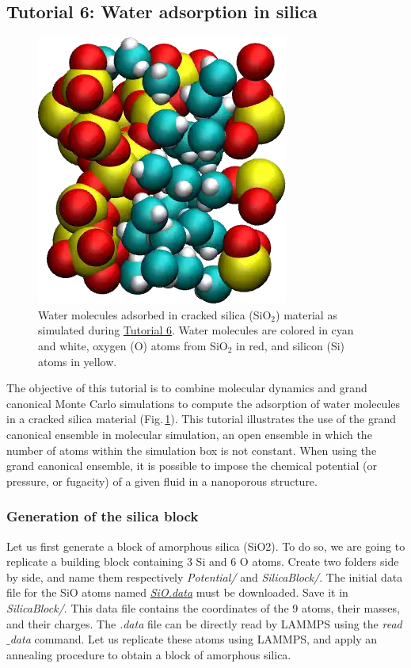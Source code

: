 \documentclass[9pt,tutorial]{livecoms}
\begin{document}
\subsection{Tutorial 6: Water adsorption in silica}
\label{gcmc-silica-label}

\begin{figure}
\centering
\includegraphics[width=0.55\linewidth]{GCMC}
\caption{Water molecules adsorbed in cracked silica (SiO$_2$) material as simulated during \hyperref[gcmc-silica-label]{Tutorial 6}. Water molecules are colored in cyan and white, oxygen (O) atoms from SiO$_2$ in red, and silicon (Si) atoms in yellow.}
\label{fig:GCMC}
\end{figure}

\noindent The objective of this tutorial is to combine molecular dynamics and grand canonical Monte Carlo simulations to compute the adsorption of water molecules in a cracked silica material (Fig.\,\ref{fig:GCMC}). This tutorial illustrates the use of the grand canonical ensemble in molecular simulation, an open ensemble in which the number of atoms within the simulation box is not constant. When using the grand canonical ensemble, it is possible to impose the chemical potential (or pressure, or fugacity) of a given fluid in a nanoporous structure.

\subsubsection{Generation of the silica block}
\noindent Let us first generate a block of amorphous silica (SiO2). To do so, we are going to replicate a building block containing 3 Si and 6 O atoms. Create two folders side by side, and name them respectively \textit{Potential/}
and \textit{SilicaBlock/}. The initial data file for the SiO atoms named \href{https://raw.githubusercontent.com/lammpstutorials/lammpstutorials-article/main/files/tutorial6/SiO.data}{\textit{SiO.data}} must be downloaded. Save it in \textit{SilicaBlock/}. This data file contains the coordinates of the 9 atoms, their masses, and their charges. The \textit{.data} file can be directly read by LAMMPS using the \textit{read$\_$data} command. Let us replicate these atoms using
LAMMPS, and apply an annealing procedure to obtain a block of amorphous silica.
\end{document}
